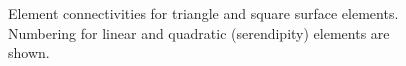 \documentclass[11pt]{article}
\begin{document}
\begin{figure}[h!p]
\centering
     \hspace{0.4in}
      \hspace{0.4in}
     \caption{Element connectivities for triangle and square surface
     elements. Numbering for linear and quadratic (serendipity) elements are
     shown.}
\end{figure}
\end{document}
